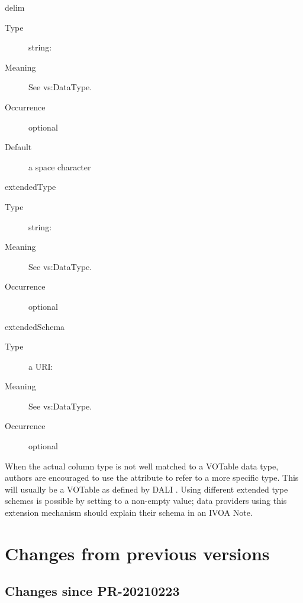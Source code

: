 \documentclass[11pt,a4paper]{ivoa}
\begin{document}
\begin{generated}
\begin{bigdescription}
\begin{description}
\end{description}
\item[delim]
\begin{description}
\item[Type] string: 
\item[Meaning] See vs:DataType.
\item[Occurrence] optional
\item[Default] a space character
\end{description}
\item[extendedType]
\begin{description}
\item[Type] string: 
\item[Meaning] See vs:DataType.
\item[Occurrence] optional
\end{description}
\item[extendedSchema]
\begin{description}
\item[Type] a URI: 
\item[Meaning] See vs:DataType.
\item[Occurrence] optional
\end{description}


\end{bigdescription}\endgroup

\endgroup
\end{generated}




When the actual column type is not
well matched to a VOTable data type, authors are
encouraged to use the  attribute to refer to
a more specific type.  This will usually be a VOTable  as
defined by DALI \citep{2017ivoa.spec.0517D}.  Using different extended
type schemes is possible by setting  to a
non-empty value; data providers using this extension mechanism should
explain their schema in an IVOA Note.

\appendix

\section{Changes from previous versions}

\subsection{Changes since PR-20210223}
\end{document}
